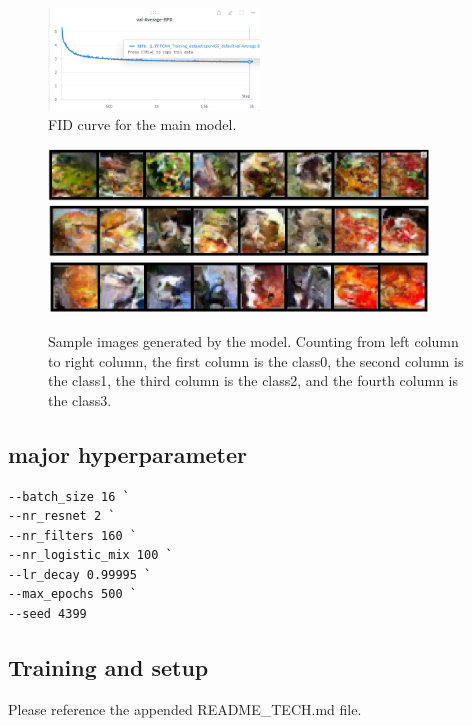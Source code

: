 \documentclass{article}
\begin{document}
  \begin{figure}
    \centering
    \includegraphics[width=0.5\textwidth]{report_data/o-bpd.png}
    \caption{ FID curve for the main model.}
    \label{fig:F-FID}
  \end{figure}

  \begin{figure}
    \centering
    \includegraphics[width=0.9\textwidth]{report_data/o-1.png}
    \includegraphics[width=0.9\textwidth]{report_data/o-2.png}
    \includegraphics[width=0.9\textwidth]{report_data/o-3.png}
    \caption{ Sample images generated by the model. Counting from left column to right column, the first column is the class0, the second column is the class1, the third column is the class2, and the fourth column is the class3.}
    \label{fig:sample}
  \end{figure}

\subsection{major hyperparameter}
\begin{verbatim}
--batch_size 16 `
--nr_resnet 2 `
--nr_filters 160 `
--nr_logistic_mix 100 `
--lr_decay 0.99995 `
--max_epochs 500 `
--seed 4399
\end{verbatim}

\subsection{Training and setup}
Please reference the appended README\_TECH.md file.
\end{document}
